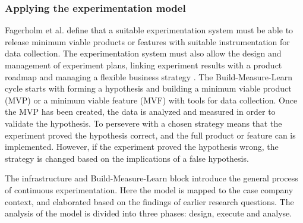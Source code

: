 \documentclass[english]{tktltiki2}
\theoremstyle{definition}
\theoremstyle{remark}
\begin{document}



\subsubsection{Applying the experimentation model}
Fagerholm et al. define that a suitable experimentation system must be able to release minimum viable products or features with suitable instrumentation for data collection. The experimentation system must also allow the design and management of experiment plans, linking experiment results with a product roadmap and managing a flexible business strategy \cite{fagerholm2014building}. The Build-Measure-Learn cycle starts with forming a hypothesis and building a minimum viable product (MVP) or a minimum viable feature (MVF) with tools for data collection. Once the MVP has been created, the data is analyzed and measured in order to validate the hypothesis. To persevere with a chosen strategy means that the experiment proved the hypothesis correct, and the full product or feature can is implemented. However, if the experiment proved the hypothesis wrong, the strategy is changed based on the implications of a false hypothesis.

The infrastructure and Build-Measure-Learn block \cite{fagerholm2014building} introduce the general process of continuous experimentation. Here the model is mapped to the case company context, and elaborated based on the findings of earlier research questions. The analysis of the model is divided into three phases: design, execute and analyse. 

\end{document}
